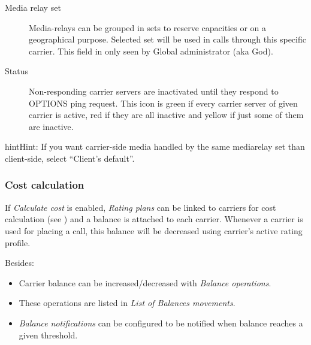 \documentclass[letterpaper,10pt,english]{sphinxmanual}
\begin{document}
\begin{description}
\item[{Media relay set}] \leavevmode{}\label{administration_portal/brand/providers/carriers:term-media-relay-set}
Media-relays can be grouped in sets to reserve capacities or on a geographical purpose. Selected set will be used
in calls through this specific carrier. This field in only seen by Global administrator (aka God).

\item[{Status}] \leavevmode{}\label{administration_portal/brand/providers/carriers:term-status}
Non-responding carrier servers are inactivated until they respond to OPTIONS ping request. This icon is green if
every carrier server of given carrier is active, red if they are all inactive and yellow if just some of them are inactive.

\end{description}

\begin{notice}{hint}{Hint:}
If you want carrier-side media handled by the same mediarelay set than client-side, select ``Client's default''.
\end{notice}


\subsubsection{Cost calculation}
\label{administration_portal/brand/providers/carriers:cost-calculation}
If \emph{Calculate cost} is enabled, \emph{Rating plans} can be linked to carriers for cost calculation (see
{\hyperref[administration_portal/brand/billing/rating_plans:assigning\string-rating\string-plans\string-to\string-carriers]{}}) and a balance is attached to each carrier. Whenever a carrier is used for
placing a call, this balance will be decreased using carrier's active rating profile.

Besides:
\begin{itemize}
\item {} 
Carrier balance can be increased/decreased with \emph{Balance operations}.

\item {} 
These operations are listed in \emph{List of Balances movements}.

\item {} 
\emph{Balance notifications} can be configured to be notified when balance reaches a given threshold.

\end{itemize}
\end{document}
